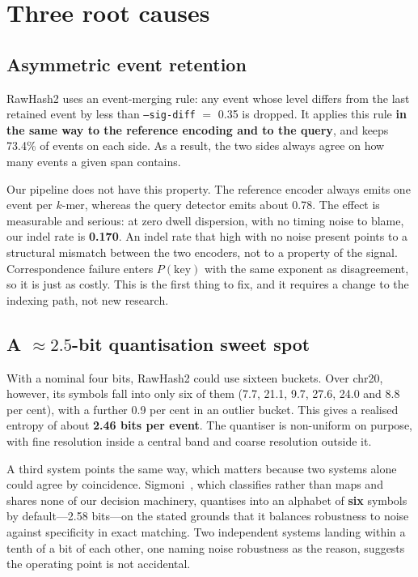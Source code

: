 \documentclass[conference]{IEEEtran}
\begin{document}
\section{Three root causes}
\label{sec:causes}

\subsection{Asymmetric event retention}

RawHash2 uses an event-merging rule: any event whose level differs from the last retained event
by less than \texttt{--sig-diff} $=$ 0.35 is dropped. It applies this rule \textbf{in the same
way to the reference encoding and to the query}, and keeps 73.4\% of events on each side. As a
result, the two sides always agree on how many events a given span contains.

Our pipeline does not have this property. The reference encoder always emits one event per
$k$-mer, whereas the query detector emits about 0.78. The effect is measurable and serious: at
zero dwell dispersion, with no timing noise to blame, our indel rate is \textbf{0.170}. An indel
rate that high with no noise present points to a structural mismatch between the two encoders,
not to a property of the signal. Correspondence failure enters $P(\mathrm{key})$ with the same
exponent as disagreement, so it is just as costly. This is the first thing to fix, and it
requires a change to the indexing path, not new research.

\subsection{A ${\approx}2.5$-bit quantisation sweet spot}

With a nominal four bits, RawHash2 could use sixteen buckets. Over chr20, however, its symbols
fall into only six of them (7.7, 21.1, 9.7, 27.6, 24.0 and 8.8 per cent), with a further 0.9 per
cent in an outlier bucket. This gives a realised entropy of about \textbf{2.46 bits per event}.
The quantiser is non-uniform on purpose, with fine resolution inside a central band and coarse
resolution outside it.

A third system points the same way, which matters because two systems alone could agree by
coincidence.
Sigmoni~\cite{sigmoni}, which classifies rather than maps and shares none of our decision
machinery, quantises into an alphabet of \textbf{six} symbols by default---2.58 bits---on the
stated grounds that it balances robustness to noise against specificity in exact matching. Two
independent systems landing within a tenth of a bit of each other, one naming noise robustness
as the reason, suggests the operating point is not accidental.
\end{document}
